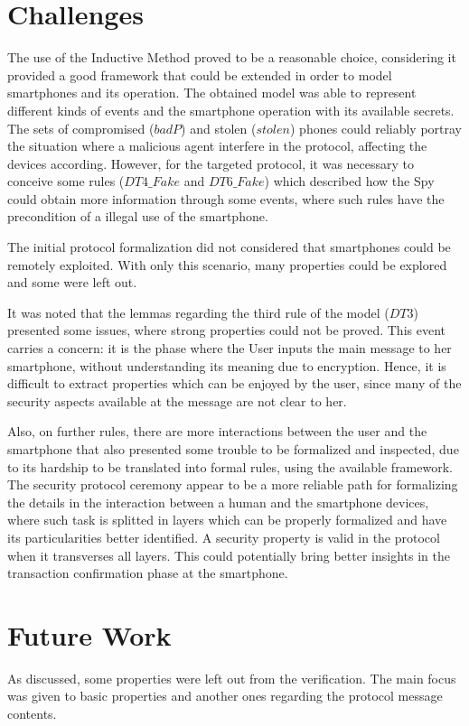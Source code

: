 \section{Challenges}
The use of the Inductive Method proved to be a reasonable choice, considering it provided a good framework that could be extended in order to model smartphones and its operation. The obtained model was able to represent different kinds of events and the smartphone operation with its available secrets. The sets of compromised ($badP$) and stolen ($stolen$) phones could reliably portray the situation where a malicious agent interfere in the protocol, affecting the devices according. However, for the targeted protocol, it was necessary to conceive some rules ($DT4\_Fake$ and $DT6\_Fake$) which described how the Spy could obtain more information through some events, where such rules have the precondition of a illegal use of the smartphone.

The initial protocol formalization did not considered that smartphones could be remotely exploited. With only this scenario, many properties could be explored and some were left out.

It was noted that the lemmas regarding the third rule of the model ($DT3$) presented some issues, where strong properties could not be proved. This event carries a concern: it is the phase where the User inputs the main message to her smartphone, without understanding its meaning due to encryption. Hence, it is difficult to extract properties which can be enjoyed by the user, since many of the security aspects available at the message are not clear to her.

Also, on further rules, there are more interactions between the user and the smartphone that also presented some trouble to be formalized and inspected, due to its hardship to be translated into formal rules, using the available framework. The security protocol ceremony \cite{Ellison07} appear to be a more reliable path for formalizing the details in the interaction between a human and the smartphone devices, where such task is splitted in layers which can be properly formalized and have its particularities better identified. A security property is valid in the protocol when it transverses all layers. This could potentially bring better insights in the transaction confirmation phase at the smartphone.


\section{Future Work}
As discussed, some properties were left out from the verification. The main focus was given to basic properties and another ones regarding the protocol message contents.

